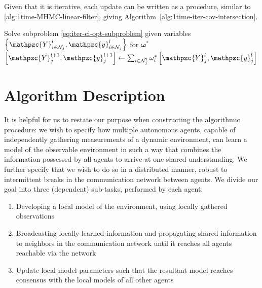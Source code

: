 Given that it is iterative, each update can be written as a procedure, similar to \ref{alg:1time-MHMC-linear-filter}, giving Algorithm~\ref{alg:1time-iter-cov-intersection}.

\begin{algorithm}
    \caption{One-time Update for Distributed Iterative Covariance Intersection}\label{alg:1time-iter-cov-intersection}
    Solve subproblem \eqref{eq:iter-ci-opt-subproblem} given variables $\left\{\mathpzc{Y}_{i\in\mathcal{N}_j}^l,\mathpzc{y}_{i\in\mathcal{N}_j}^l\right\}$ for $\bm{\omega}^*$\;
    $\left[\mathpzc{Y}_j^{l+1},\mathpzc{y}_j^{l+1}\right]\gets\sum_{i\in\mathcal{N}_j^l}\omega^*_i\left[\mathpzc{Y}_j^l,\mathpzc{y}_j^l\right]$\;
\end{algorithm}

\section{Algorithm Description}

It is helpful for us to restate our purpose when constructing the algorithmic procedure: we wish to specify how multiple autonomous agents, capable of independently gathering measurements of a dynamic environment, can learn a model of the observable environment in such a way that combines the information possessed by all agents to arrive at one shared understanding. We further specify that we wish to do so in a distributed manner, robust to intermittent breaks in the communication network between agents. We divide our goal into three (dependent) sub-tasks, performed by each agent:

\begin{enumerate}
    \item Developing a local model of the environment, using locally gathered observations
    \item Broadcasting locally-learned information and propagating shared information to neighbors in the communication network until it reaches all agents reachable via the network
    \item Update local model parameters such that the resultant model reaches consensus with the local models of all other agents
\end{enumerate}

